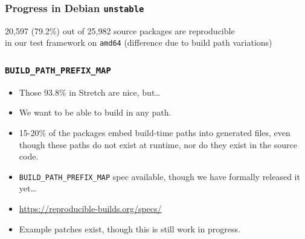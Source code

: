 \documentclass[14pt]{beamer}
\begin{document}
\begin{frame}
 \frametitle{Progress in Debian \texttt{unstable}}
 \begin{center}
  \footnotesize{20,597 (79.2\%) out of 25,982 source packages are reproducible \\
    in our test framework on \texttt{amd64}} (difference due to build path variations)
  \vfill
 \end{center}
\end{frame}

\begin{frame}
 \frametitle{\texttt{BUILD\_PATH\_PREFIX\_MAP}}

 \begin{itemize}
  \item Those 93.8\% in Stretch are nice, but…
  \item We want to be able to build in any path.
  \item 15-20\% of the packages embed build-time paths into generated files, even though these paths do not exist at runtime, nor do they exist in the source code.
  \item \texttt{BUILD\_PATH\_PREFIX\_MAP} spec available, though we have formally released it yet…
  \item \url{https://reproducible-builds.org/specs/}
  \item Example patches exist, though this is still work in progress.
 \end{itemize}
\end{frame}
\end{document}
